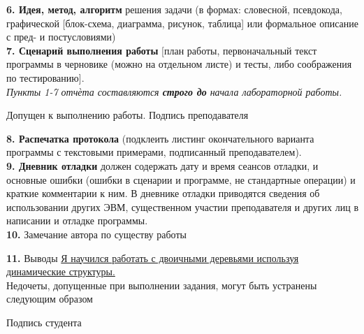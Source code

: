 \documentclass[10pt]{report}
\begin{document}
    \begin{spacing}{1}
        \indent \textbf{6. Идея, метод, алгоритм} решения задачи (в формах: словесной, псевдокода, графической [блок-схема, диаграмма, рисунок, таблица] или формальное описание с пред- и постусловиями)\\
        
    
        \indent \textbf{7. Сценарий выполнения работы} [план работы, первоначальный текст программы в черновике (можно на отдельном листе) и тесты, либо соображения по тестированию].\\
        
        \textit{Пункты 1-7 отчѐта составляются \textbf{строго до} начала лабораторной работы.}\\
        \begin{flushright}
            Допущен к выполнению работы. Подпись преподавателя \underline{\hspace{1.5in}}\\
        \end{flushright}
    
        \indent \textbf{8. Распечатка протокола} (подклеить листинг окончательного варианта программы с текстовыми
        примерами, подписанный преподавателем).\\
        
    
        \indent \textbf{9. Дневник отладки} должен содержать дату и время сеансов отладки, и основные ошибки (ошибки в
        сценарии и программе, не стандартные операции) и краткие комментарии к ним. В дневнике отладки
        приводятся сведения об использовании других ЭВМ, существенном участии преподавателя и других
        лиц в написании и отладке программы.\\
        
        
        \indent \textbf{10.} Замечание автора по существу работы \underline{\hspace{3.5in}}\\
        \underline{\hspace{5.5in}}
        
        \indent \textbf{11.} Выводы \underline{\hspace{0.1in}Я научился работать с двоичными деревьями используя динамические структуры.\hspace{0.2in}}\\


        Недочеты, допущенные при выполнении задания, могут быть устранены следующим образом \underline{\hspace{0.5in}}\\
        \underline{\hspace{5.5in}}

        \begin{flushright}
            Подпись студента \underline{\hspace{1.5in}}\\
        \end{flushright}

    \end{spacing}
    
   
    
    
\end{document}
